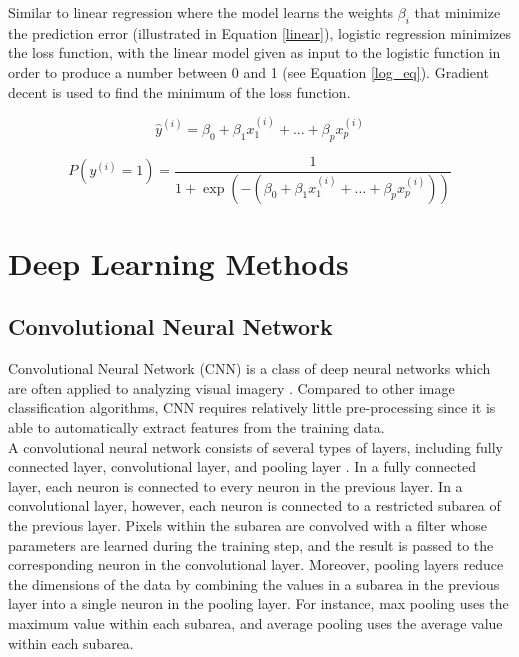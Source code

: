 \noindent
Similar to linear regression where the model learns the weights $\beta_i$ that minimize the prediction error (illustrated in Equation \eqref{linear}), logistic regression minimizes the loss function, with the linear model given as input to the logistic function in order to produce a number between 0 and 1 (see Equation \eqref{log_eq}). Gradient decent is used to find the minimum of the loss function.


\begin{equation}
\hat{y}^{(i)}=\beta_{0}+\beta_{1} x_{1}^{(i)}+\ldots+\beta_{p} x_{p}^{(i)}
\label{linear}
\end{equation}

\begin{equation}
P\left(y^{(i)}=1\right)=\frac{1}{1+\exp \left(-\left(\beta_{0}+\beta_{1} x_{1}^{(i)}+\ldots+\beta_{p} x_{p}^{(i)}\right)\right)}
\label{log_eq}
\end{equation}


\newpage

\section{Deep Learning Methods}\label{deep}

\subsection{Convolutional Neural Network}

\noindent Convolutional Neural Network (CNN) is a class of deep neural networks which are often applied to analyzing visual imagery \cite{cnn_anomaly1}\cite{cnn_anomaly2}. Compared to other image classification algorithms, CNN requires relatively little pre-processing since it is able to automatically extract features from the training data.\\

\noindent A convolutional neural network consists of several types of layers, including fully connected layer, convolutional layer, and pooling layer \cite{cnn}. In a fully connected layer, each neuron is connected to every neuron in the previous layer. In a convolutional layer, however, each neuron is connected to a restricted subarea of the previous layer. Pixels within the subarea are convolved with a filter whose parameters are learned during the training step, and the result is passed to the corresponding neuron in the convolutional layer. Moreover, pooling layers reduce the dimensions of the data by combining the values in a subarea in the previous layer into a single neuron in the pooling layer. For instance, max pooling uses the maximum value within each subarea, and average pooling uses the average value within each subarea.\\

